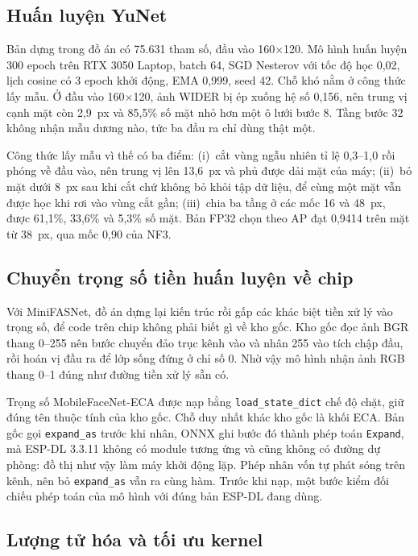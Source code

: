 \documentclass[../DoAn.tex]{subfiles}
\begin{document}
\subsection{Huấn luyện YuNet}
\label{section:4.3.2}

Bản dựng trong đồ án có 75.631 tham số, đầu vào 160$\times$120. Mô hình huấn luyện 300 epoch trên RTX 3050 Laptop, batch 64, SGD Nesterov với tốc độ học 0,02, lịch cosine có 3 epoch khởi
động, EMA 0,999, seed 42. Chỗ khó nằm ở công thức lấy mẫu. Ở đầu vào 160$\times$120, ảnh WIDER
bị ép xuống hệ số 0,156, nên trung vị cạnh mặt còn 2,9~px và 85,5\% số mặt nhỏ hơn một ô lưới
bước 8. Tầng bước 32 không nhận mẫu dương nào, tức ba đầu ra chỉ dùng thật một.

Công thức lấy mẫu vì thế có ba điểm: (i)~cắt vùng ngẫu nhiên tỉ lệ 0,3--1,0 rồi phóng về đầu
vào, nên trung vị lên 13,6~px và phủ được dải mặt của máy; (ii)~bỏ mặt dưới 8~px sau khi cắt
chứ không bỏ khỏi tập dữ liệu, để cùng một mặt vẫn được học khi rơi vào vùng cắt gần; (iii)~chia
ba tầng ở các mốc 16 và 48~px, được 61,1\%, 33,6\% và 5,3\% số mặt. Bản FP32 chọn theo AP đạt
0,9414 trên mặt từ 38~px, qua mốc 0,90 của NF3.

\subsection{Chuyển trọng số tiền huấn luyện về chip}
\label{section:4.3.3}

Với MiniFASNet, đồ án dựng lại kiến trúc rồi gấp các khác biệt tiền xử lý vào
trọng số, để code trên chip không phải biết gì về kho gốc. Kho gốc đọc ảnh BGR thang 0--255 nên
bước chuyển đảo trục kênh vào và nhân 255 vào tích chập đầu, rồi hoán vị đầu ra để lớp sống đứng ở
chỉ số 0. Nhờ vậy mô hình nhận ảnh RGB thang 0--1 đúng như đường tiền xử lý sẵn có.

Trọng số MobileFaceNet-ECA được nạp bằng \texttt{load\_state\_dict}
chế độ chặt, giữ đúng tên thuộc tính của kho gốc. Chỗ duy nhất khác kho gốc là khối ECA. Bản gốc
gọi \texttt{expand\_as} trước khi nhân, ONNX ghi bước đó thành phép toán \texttt{Expand}, mà ESP-DL
3.3.11 không có module tương ứng và cũng không có đường dự phòng: đồ thị như vậy làm máy khởi động lặp. Phép nhân vốn tự phát sóng trên kênh, nên bỏ \texttt{expand\_as} vẫn ra cùng hàm. Trước khi nạp, một bước kiểm đối chiếu
phép toán của mô hình với đúng bản ESP-DL đang dùng.

\subsection{Lượng tử hóa và tối ưu kernel}
\label{section:4.3.4}
\end{document}
